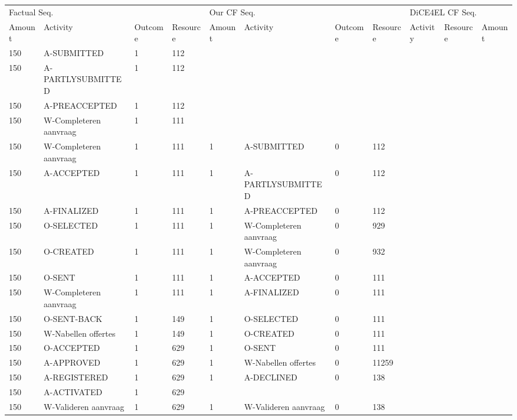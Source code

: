 \begin{tabular}{lllllllllll}
\toprule
\multicolumn{4}{l}{Factual Seq.} & \multicolumn{4}{l}{Our CF Seq.} & \multicolumn{3}{l}{DiCE4EL CF Seq.} \\
Amount & Activity & Outcome & Resource & Amount & Activity & Outcome & Resource & Activity & Resource & Amount \\
\midrule
150 & A-SUBMITTED & 1 & 112 &  &  &  &  &  &  &  \\
150 & A-PARTLYSUBMITTED & 1 & 112 &  &  &  &  &  &  &  \\
150 & A-PREACCEPTED & 1 & 112 &  &  &  &  &  &  &  \\
150 & W-Completeren aanvraag & 1 & 111 &  &  &  &  &  &  &  \\
150 & W-Completeren aanvraag & 1 & 111 & 1 & A-SUBMITTED & 0 & 112 &  &  &  \\
150 & A-ACCEPTED & 1 & 111 & 1 & A-PARTLYSUBMITTED & 0 & 112 &  &  &  \\
150 & A-FINALIZED & 1 & 111 & 1 & A-PREACCEPTED & 0 & 112 &  &  &  \\
150 & O-SELECTED & 1 & 111 & 1 & W-Completeren aanvraag & 0 & 929 &  &  &  \\
150 & O-CREATED & 1 & 111 & 1 & W-Completeren aanvraag & 0 & 932 &  &  &  \\
150 & O-SENT & 1 & 111 & 1 & A-ACCEPTED & 0 & 111 &  &  &  \\
150 & W-Completeren aanvraag & 1 & 111 & 1 & A-FINALIZED & 0 & 111 &  &  &  \\
150 & O-SENT-BACK & 1 & 149 & 1 & O-SELECTED & 0 & 111 &  &  &  \\
150 & W-Nabellen offertes & 1 & 149 & 1 & O-CREATED & 0 & 111 &  &  &  \\
150 & O-ACCEPTED & 1 & 629 & 1 & O-SENT & 0 & 111 &  &  &  \\
150 & A-APPROVED & 1 & 629 & 1 & W-Nabellen offertes & 0 & 11259 &  &  &  \\
150 & A-REGISTERED & 1 & 629 & 1 & A-DECLINED & 0 & 138 &  &  &  \\
150 & A-ACTIVATED & 1 & 629 &  &  &  &  &  &  &  \\
150 & W-Valideren aanvraag & 1 & 629 & 1 & W-Valideren aanvraag & 0 & 138 &  &  &  \\
\bottomrule
\end{tabular}
